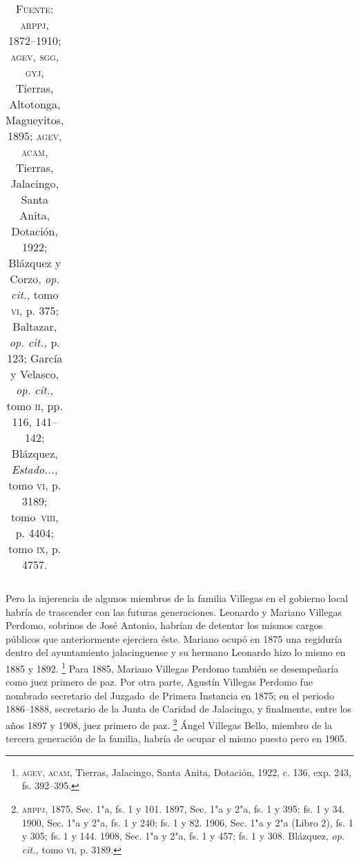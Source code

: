 \documentclass[14pt,twoside,final]{extbook} %
\let\oldfootnote\footnote
\renewcommand\footnote[1]{%
\oldfootnote{\hspace{1mm}#1}}
\begin{document}
\begin{sidewaystable}
\begin{small}
\begin{tabular}{@{}lllc@{}}
\bottomrule
\end{tabular}
\end{small}
\caption*{\textsc{Fuente:} \textsc{arppj}, 1872--1910; \textsc{agev, sgg, gyj}, Tierras, Altotonga, Magueyitos, 1895; \textsc{agev, acam}, Tierras, Jalacingo, Santa Anita, Dotación, 1922; Blázquez y Corzo, \emph{op. cit.,} tomo \textsc{vi}, p. 375; Baltazar, \emph{op. cit.,} p. 123; García y Velasco, \emph{op. cit.,} tomo \textsc{ii}, pp. 116, 141--142; Blázquez, \emph{Estado...,} tomo \textsc{vi}, p. 3189; tomo~\textsc{viii}, p. 4404; tomo \textsc{ix}, p. 4757.}
\label{tab:villegas-politica}
\end{sidewaystable}

Pero la injerencia de algunos miembros de la familia Villegas en el gobierno local habría de trascender con las futuras generaciones. Leonardo y Mariano Villegas Perdomo, sobrinos de José Antonio, habrían de detentar los mismos cargos públicos que anteriormente ejerciera éste. Mariano ocupó en 1875 una regiduría dentro del ayuntamiento jalacinguense y su hermano Leonardo hizo lo mismo en 1885 y 1892.\footnote{\textsc{agev, acam}, Tierras, Jalacingo, Santa Anita, Dotación, 1922, c. 136, exp. 243, fs. 392--395.} Para 1885, Mariano Villegas Perdomo también se desempeñaría como juez primero de paz. Por otra parte, Agustín Villegas Perdomo fue nombrado secretario del Juzgado~de Primera Instancia en 1875; en el periodo 1886--1888, secretario de la Junta de Caridad de Jalacingo, y finalmente, entre los años 1897 y 1908, juez primero de paz.\footnote{\textsc{arppj}, 1875, Sec. 1"a, fs. 1 y 101. 1897, Sec. 1"a y 2"a, fs. 1 y 395; fs. 1 y 34. 1900, Sec. 1"a y 2"a, fs. 1 y 240; fs. 1 y 82. 1906, Sec. 1"a y 2"a (Libro 2), fs. 1 y 305; fs. 1 y 144. 1908, Sec. 1"a y 2"a, fs. 1 y 457; fs. 1 y 308. Blázquez, \emph{op. cit.,} tomo \textsc{vi}, p. 3189.} Ángel Villegas Bello, miembro de la tercera generación de la familia, habría de ocupar el mismo puesto pero en 1905.
\end{document}
